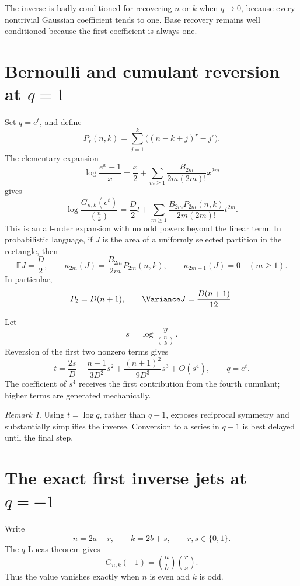 \documentclass[11pt,letterpaper,oneside,openany]{book}
\theoremstyle{definition}
\theoremstyle{remark}
\newtheorem{remark}[theorem]{Remark}
\begin{document}
The inverse is badly conditioned for recovering \(n\) or \(k\) when
\(q\to0\), because every nontrivial Gaussian coefficient tends to one.  Base
recovery remains well conditioned because the first coefficient is always
one.

\section{Bernoulli and cumulant reversion at \texorpdfstring{\(q=1\)}{q=1}}
Set \(q=e^t\), and define
\[
 P_r(n,k)=\sum_{j=1}^{k}\bigl((n-k+j)^r-j^r\bigr).
\]
The elementary expansion
\[
 \log\frac{e^x-1}{x}
 =\frac x2+\sum_{m\ge1}\frac{B_{2m}}{2m(2m)!}x^{2m}
\]
gives
\begin{equation}\label{eq:gaussian-q1-forward}
 \log\frac{G_{n,k}(e^t)}{\binom nk}
 =\frac D2t+
 \sum_{m\ge1}\frac{B_{2m}P_{2m}(n,k)}{2m(2m)!}t^{2m}.
\end{equation}
This is an all-order expansion with no odd powers beyond the linear term.  In
probabilistic language, if \(J\) is the area of a uniformly selected partition
in the rectangle, then
\[
 \mathbb E J=\frac D2,
 \qquad
 \kappa_{2m}(J)=\frac{B_{2m}}{2m}P_{2m}(n,k),
 \qquad
 \kappa_{2m+1}(J)=0\quad(m\ge1).
\]
In particular,
\[
 P_2=D(n+1),
 \qquad
 \Variance J=\frac{D(n+1)}{12}.
\]

Let
\[
 s=\log\frac{y}{\binom nk}.
\]
Reversion of the first two nonzero terms gives
\begin{equation}\label{eq:gaussian-q1-inverse}
 t=\frac{2s}{D}-\frac{n+1}{3D^2}s^2
 +\frac{(n+1)^2}{9D^3}s^3+O(s^4),
 \qquad q=e^t.
\end{equation}
The coefficient of \(s^4\) receives the first contribution from the fourth
cumulant; higher terms are generated mechanically.

\begin{remark}
Using \(t=\log q\), rather than \(q-1\), exposes reciprocal symmetry and
substantially simplifies the inverse.  Conversion to a series in \(q-1\) is
best delayed until the final step.
\end{remark}

\section{The exact first inverse jets at \texorpdfstring{\(q=-1\)}{q=-1}}
Write
\[
 n=2a+r,
 \qquad k=2b+s,
 \qquad r,s\in\{0,1\}.
\]
The \(q\)-Lucas theorem gives
\begin{equation}\label{eq:q-lucas-minus-one}
 G_{n,k}(-1)=\binom ab\binom rs.
\end{equation}
Thus the value vanishes exactly when \(n\) is even and \(k\) is odd.
\end{document}
